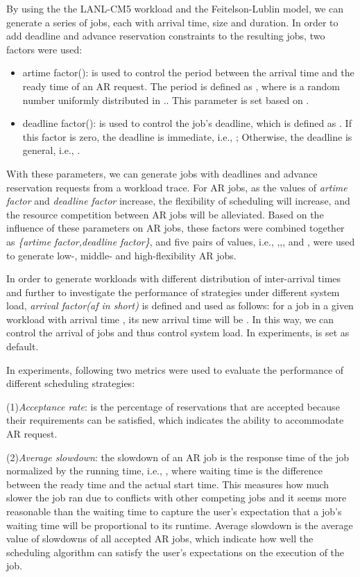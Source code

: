 \documentclass[preprint,12pt]{elsarticle}
\begin{document}
By using the the LANL-CM5 workload and the Feitelson-Lublin model, we can generate a series of jobs, each with arrival time, size and duration. In order to add deadline and advance reservation constraints to the resulting jobs, two factors were used:

\begin{itemize}
\item{artime factor(): is used to control the period between the arrival time  and the ready time  of an AR request. The period is defined as , where  is a random number uniformly distributed in .}. This parameter is set based on \cite{heine2005}.
\item{deadline factor(): is used to control the job's deadline, which is defined as . If this factor is zero, the deadline is immediate, i.e., ; Otherwise, the deadline is general, i.e., .}
\end{itemize}

With these parameters, we can generate jobs with deadlines and advance reservation requests from a workload trace. For AR jobs, as the values of \emph{artime factor} and \emph{deadline factor} increase, the flexibility of scheduling will increase, and the resource competition between AR jobs will be alleviated. Based on the influence of these parameters on AR jobs, these factors were combined together as \emph{\{artime factor,deadline factor\}}, and five pairs of values, i.e., ,,, and , were used to generate low-, middle- and high-flexibility AR jobs.


In order to generate workloads with different distribution of inter-arrival times and further to investigate the performance of strategies under different system load, \emph{arrival factor(af in short)} is defined and used as follows: for a job in a given workload with arrival time , its new arrival time will be . In this way, we can control the arrival of jobs and thus control system load. In experiments,  is set as default.


In experiments, following two metrics were used to evaluate the performance of different scheduling strategies:

(1)\emph{Acceptance rate}: is the percentage of reservations that are accepted because their requirements can be satisfied, which indicates the ability to accommodate AR request.

(2)\emph{Average slowdown}: the slowdown of an AR job is the response time of the job normalized by the running time, i.e., , where waiting time is the difference between the ready time and the actual start time. This measures how much slower the job ran due to conflicts with other competing jobs and it seems more reasonable than the waiting time to capture the user's expectation that a job's waiting time will be proportional to its runtime. Average slowdown is the average value of slowdowns of all accepted AR jobs, which indicate how well the scheduling algorithm can satisfy the user's expectations on the execution of the job.
\end{document}
